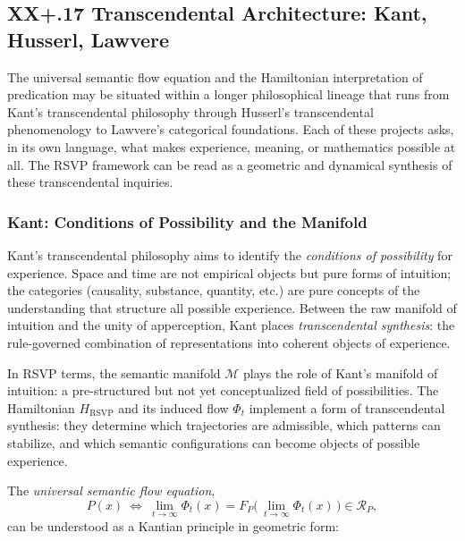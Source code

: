 \documentclass[12pt,letterpaper]{article}
\begin{document}
\subsection{XX+.17 Transcendental Architecture: Kant, Husserl, Lawvere}

The universal semantic flow equation and the Hamiltonian interpretation of
predication may be situated within a longer philosophical lineage that runs from
Kant’s transcendental philosophy through Husserl’s transcendental phenomenology
to Lawvere’s categorical foundations.  Each of these projects asks, in its own
language, what makes experience, meaning, or mathematics possible at all.  The
RSVP framework can be read as a geometric and dynamical synthesis of these
transcendental inquiries.

\subsubsection*{Kant: Conditions of Possibility and the Manifold}

Kant’s transcendental philosophy aims to identify the \emph{conditions of
possibility} for experience.  Space and time are not empirical objects but pure
forms of intuition; the categories (causality, substance, quantity, etc.) are
pure concepts of the understanding that structure all possible experience.
Between the raw manifold of intuition and the unity of apperception, Kant places
\emph{transcendental synthesis}: the rule-governed combination of representations
into coherent objects of experience.

In RSVP terms, the semantic manifold $\mathcal{M}$ plays the role of Kant’s
manifold of intuition: a pre-structured but not yet conceptualized field of
possibilities.  The Hamiltonian $H_{\mathrm{RSVP}}$ and its induced flow
$\Phi_t$ implement a form of transcendental synthesis: they determine which
trajectories are admissible, which patterns can stabilize, and which semantic
configurations can become objects of possible experience.

The \emph{universal semantic flow equation},
\[
P(x)\ \Longleftrightarrow\ 
\lim_{t \to \infty} \Phi_t(x)
=
F_P\bigl(\,\lim_{t \to \infty} \Phi_t(x)\,\bigr)
\in \mathcal{R}_P,
\]
can be understood as a Kantian principle in geometric form:
\end{document}
